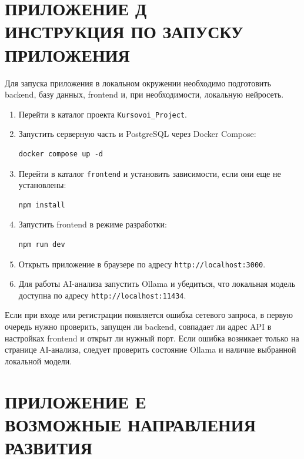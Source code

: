 \documentclass[14pt,a4paper]{extreport}
\begin{document}
\chapter*{ПРИЛОЖЕНИЕ Д\\ИНСТРУКЦИЯ ПО ЗАПУСКУ ПРИЛОЖЕНИЯ}

Для запуска приложения в локальном окружении необходимо подготовить backend, базу данных, frontend и, при необходимости, локальную нейросеть.

\begin{enumerate}
    \item Перейти в каталог проекта \texttt{Kursovoi\_Project}.
    \item Запустить серверную часть и PostgreSQL через Docker Compose:
\begin{Verbatim}[fontsize=\small]
docker compose up -d
\end{Verbatim}
    \item Перейти в каталог \texttt{frontend} и установить зависимости, если они еще не установлены:
\begin{Verbatim}[fontsize=\small]
npm install
\end{Verbatim}
    \item Запустить frontend в режиме разработки:
\begin{Verbatim}[fontsize=\small]
npm run dev
\end{Verbatim}
    \item Открыть приложение в браузере по адресу \texttt{http://localhost:3000}.
    \item Для работы AI-анализа запустить Ollama и убедиться, что локальная модель доступна по адресу \texttt{http://localhost:11434}.
\end{enumerate}

Если при входе или регистрации появляется ошибка сетевого запроса, в первую очередь нужно проверить, запущен ли backend, совпадает ли адрес API в настройках frontend и открыт ли нужный порт. Если ошибка возникает только на странице AI-анализа, следует проверить состояние Ollama и наличие выбранной локальной модели.

\chapter*{ПРИЛОЖЕНИЕ Е\\ВОЗМОЖНЫЕ НАПРАВЛЕНИЯ РАЗВИТИЯ}
\end{document}
